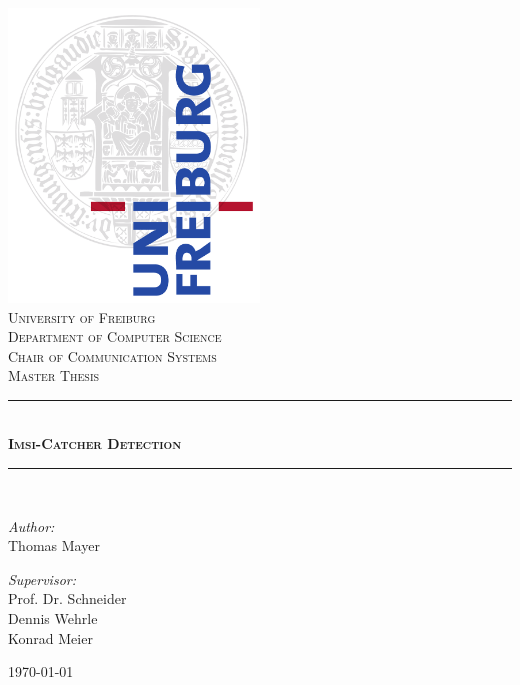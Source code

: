 
\begin{fullsizetitle}
	\thispagestyle{empty}
	\begin{center}
		\includegraphics[width=0.5\textwidth]{../Images/unisiegel}\\[1cm]

		\textsc{\LARGE University of Freiburg}\\[0.5cm]
		\textsc{Department of Computer Science\\Chair of Communication Systems}\\[2cm]
		\textsc{\LARGE Master Thesis}\\[0.5cm]

		\rule{0.7\linewidth}{0.5mm} \\[0.7cm]
		\textsc{\huge \bfseries Imsi-Catcher Detection}\\[0.4cm]
		\rule{0.7\linewidth}{0.5mm} \\[1.5cm]

		\begin{minipage}{0.4\textwidth}
			\begin{flushleft} \large
				\emph{Author:}\\
				Thomas Mayer
			\end{flushleft}
		\end{minipage}
		\begin{minipage}{0.4\textwidth}
			\begin{flushright} \large
				\emph{Supervisor:} \\
				Prof. Dr. Schneider\\
				Dennis Wehrle\\
				Konrad Meier
			\end{flushright}
		\end{minipage}

		\vfill
		{\large \today}
	\end{center}
\end{fullsizetitle}
